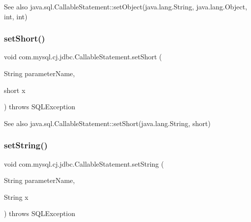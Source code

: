 \begin{DoxySeeAlso}{See also}
java.\+sql.\+Callable\+Statement\+::set\+Object(java.\+lang.\+String, java.\+lang.\+Object, int, int) 
\end{DoxySeeAlso}
\mbox{\label{classcom_1_1mysql_1_1cj_1_1jdbc_1_1_callable_statement_a3e077220a5f501fd6a1455055ac27aa5}} 
\subsubsection{\texorpdfstring{set\+Short()}{setShort()}}
{\footnotesize\ttfamily void com.\+mysql.\+cj.\+jdbc.\+Callable\+Statement.\+set\+Short (\begin{DoxyParamCaption}\item[{String}]{parameter\+Name,  }\item[{short}]{x }\end{DoxyParamCaption}) throws S\+Q\+L\+Exception}

\begin{DoxySeeAlso}{See also}
java.\+sql.\+Callable\+Statement\+::set\+Short(java.\+lang.\+String, short) 
\end{DoxySeeAlso}
\mbox{\label{classcom_1_1mysql_1_1cj_1_1jdbc_1_1_callable_statement_a31f6dfa1f9643a1b4ed3efd57d00bc2b}} 
\subsubsection{\texorpdfstring{set\+String()}{setString()}}
{\footnotesize\ttfamily void com.\+mysql.\+cj.\+jdbc.\+Callable\+Statement.\+set\+String (\begin{DoxyParamCaption}\item[{String}]{parameter\+Name,  }\item[{String}]{x }\end{DoxyParamCaption}) throws S\+Q\+L\+Exception}

